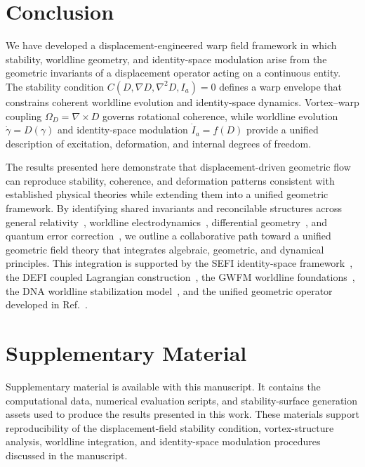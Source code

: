 \documentclass[aip,adv,reprint]{revtex4-2}
\begin{document}
\section{Conclusion}

We have developed a displacement-engineered warp field framework in which
stability, worldline geometry, and identity-space modulation arise from the
geometric invariants of a displacement operator acting on a continuous entity.
The stability condition $C(D,\nabla D,\nabla^2 D,I_a)=0$ defines a warp envelope
that constrains coherent worldline evolution and identity-space dynamics.
Vortex--warp coupling $\Omega_D=\nabla\times D$ governs rotational coherence,
while worldline evolution $\dot{\gamma}=D(\gamma)$ and identity-space modulation
$\dot{I}_a=f(D)$ provide a unified description of excitation, deformation, and
internal degrees of freedom.

The results presented here demonstrate that displacement-driven geometric flow
can reproduce stability, coherence, and deformation patterns consistent with
established physical theories while extending them into a unified geometric
framework. By identifying shared invariants and reconcilable structures across
general relativity~\cite{MTW_Gravitation_1973}, worldline electrodynamics~\cite{Wheeler_Feynman_1945,Wheeler_Feynman_1949},
differential geometry~\cite{Frenet_1851,Serret_1851}, and quantum error
correction~\cite{GKP_2001,Mirrahimi_2014,Michael_2016}, we outline a collaborative
path toward a unified geometric field theory that integrates algebraic,
geometric, and dynamical principles. This integration is supported by the SEFI
identity-space framework~\cite{Dutton_SEFI_JMP_2026}, the DEFI coupled Lagrangian
construction~\cite{Dutton_DEFI_2026}, the GWFM worldline foundations~\cite{Dutton_GWFM_JMP_2026},
the DNA worldline stabilization model~\cite{Dutton_DNA_2026}, and the unified
geometric operator developed in Ref.~\cite{Dutton_Unified_JMP_2026}.

\section*{Supplementary Material}

Supplementary material is available with this manuscript. It contains the computational data, numerical evaluation scripts, and stability-surface generation assets used to produce the results presented in this work. These materials support reproducibility of the displacement-field stability condition, vortex-structure analysis, worldline integration, and identity-space modulation procedures discussed in the manuscript.
\end{document}
